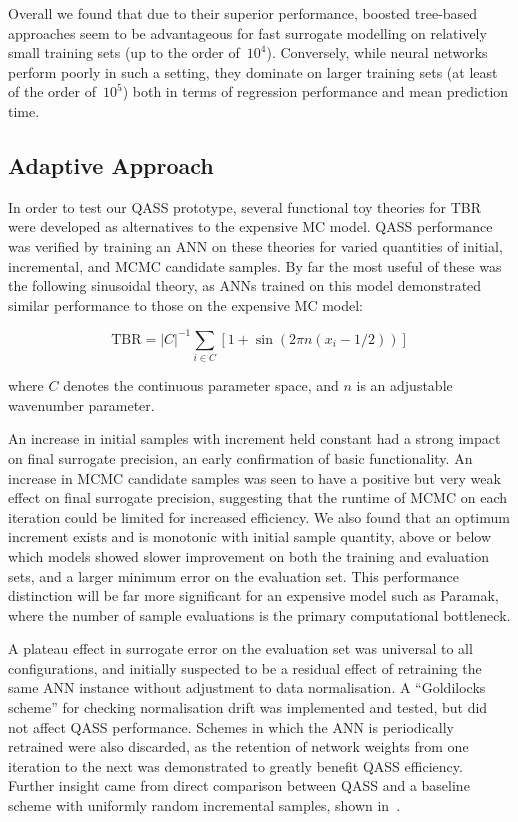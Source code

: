 Overall we found that due to their superior performance, boosted tree-based
approaches seem to be advantageous for fast surrogate modelling on relatively small training
sets (up to the order of~$10^4$). Conversely, while neural networks perform
poorly in such a setting, they dominate on larger training sets (at least of the
order of~$10^5$) both in terms of regression performance and mean prediction time.

\subsection{Adaptive Approach}\label{sec:adaptiveres}


In order to test our QASS prototype, several functional toy theories for TBR were developed as alternatives to the expensive MC model. QASS performance was verified by training an ANN on
these theories for varied quantities of initial, incremental, and MCMC
candidate samples. By far the most useful
of these was the following sinusoidal theory, as ANNs trained on this model demonstrated similar performance to those on the expensive
MC model:

\begin{equation}
	\text{TBR} = |C|^{-1}\sum_{i \in C} \left[1 + \sin(2\pi n (x_i - 1/2)) \right]
\end{equation}

where $C$ denotes the continuous parameter space, and $n$ is an adjustable wavenumber parameter.

An increase in initial samples with increment held constant had a strong impact
on final surrogate precision, an early confirmation of basic functionality. An
increase in MCMC candidate samples was seen to have a positive but very weak
effect on final surrogate precision, suggesting that the runtime of MCMC on each
iteration could be limited for increased efficiency. We also found that an optimum increment exists and is monotonic with initial sample quantity, above or below which models showed slower improvement on both the training and evaluation sets, and a larger minimum error on the
evaluation set. This performance distinction will be far more
significant for an expensive model such as Paramak, where the number of sample
evaluations is the primary computational bottleneck.

A plateau effect in surrogate error on the evaluation set was universal to all configurations, and initially suspected to be a residual
effect of retraining the same ANN instance without adjustment to data
normalisation. A ``Goldilocks scheme'' for checking normalisation drift was
implemented and tested, but did not affect QASS performance. Schemes in which
the ANN is periodically retrained were also discarded, as the retention of
network weights from one iteration to the next was demonstrated to greatly
benefit QASS efficiency. Further insight came from direct comparison between
QASS and a baseline scheme with uniformly random incremental samples, shown
in~.

